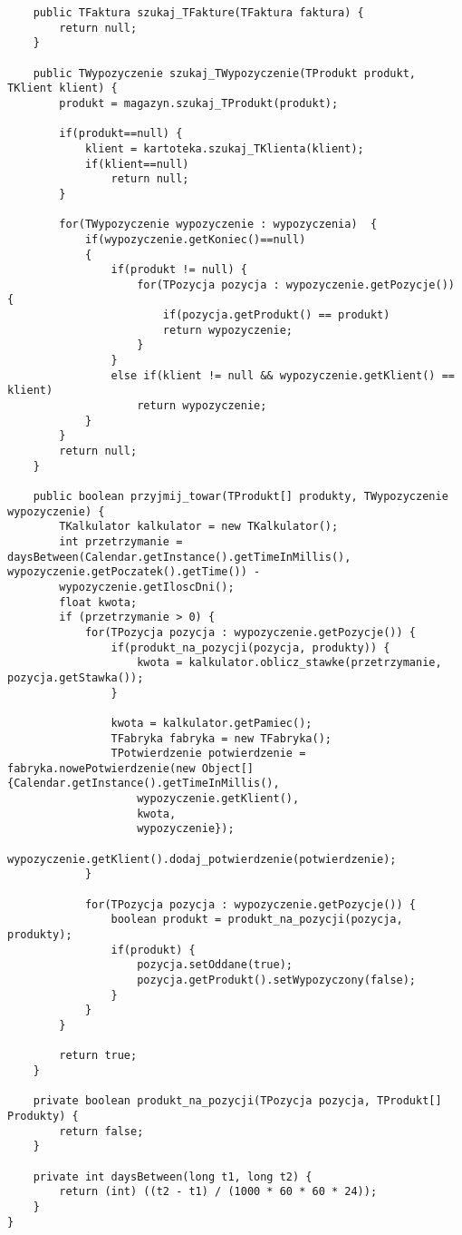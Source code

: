 \documentclass{article}
\begin{document}
\begin{verbatim}
	public TFaktura szukaj_TFakture(TFaktura faktura) {
		return null;
	}
	
	public TWypozyczenie szukaj_TWypozyczenie(TProdukt produkt, TKlient klient)	{
		produkt = magazyn.szukaj_TProdukt(produkt);
		
		if(produkt==null) {
			klient = kartoteka.szukaj_TKlienta(klient);
			if(klient==null) 
				return null;
		}
		
		for(TWypozyczenie wypozyczenie : wypozyczenia)	{
			if(wypozyczenie.getKoniec()==null) 
			{
				if(produkt != null)	{
					for(TPozycja pozycja : wypozyczenie.getPozycje())	{
						if(pozycja.getProdukt() == produkt)
						return wypozyczenie;
					}          
				}
				else if(klient != null && wypozyczenie.getKlient() == klient)
					return wypozyczenie;
			}
		}
		return null;
	}
	
	public boolean przyjmij_towar(TProdukt[] produkty, TWypozyczenie wypozyczenie) {
		TKalkulator kalkulator = new TKalkulator();
		int przetrzymanie = daysBetween(Calendar.getInstance().getTimeInMillis(), wypozyczenie.getPoczatek().getTime()) - 
		wypozyczenie.getIloscDni();
		float kwota;
		if (przetrzymanie > 0) {
			for(TPozycja pozycja : wypozyczenie.getPozycje()) {
				if(produkt_na_pozycji(pozycja, produkty)) {
					kwota = kalkulator.oblicz_stawke(przetrzymanie, pozycja.getStawka());
				}
				
				kwota = kalkulator.getPamiec();
				TFabryka fabryka = new TFabryka();
				TPotwierdzenie potwierdzenie = fabryka.nowePotwierdzenie(new Object[]{Calendar.getInstance().getTimeInMillis(), 
					wypozyczenie.getKlient(), 
					kwota, 
					wypozyczenie});
				wypozyczenie.getKlient().dodaj_potwierdzenie(potwierdzenie);
			}
			
			for(TPozycja pozycja : wypozyczenie.getPozycje()) {
				boolean produkt = produkt_na_pozycji(pozycja, produkty);
				if(produkt) {
					pozycja.setOddane(true);
					pozycja.getProdukt().setWypozyczony(false);
				}
			}    
		}
		
		return true;
	}
	
	private boolean produkt_na_pozycji(TPozycja pozycja, TProdukt[] Produkty) {
		return false;
	}
	
	private int daysBetween(long t1, long t2) {
		return (int) ((t2 - t1) / (1000 * 60 * 60 * 24));
	} 
}
\end{verbatim}
\end{document}
